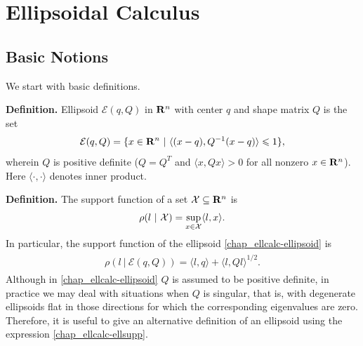 \documentclass[letterpaper,10pt,english]{sphinxmanual}
\begin{document}
\chapter{Ellipsoidal Calculus}
\label{chap_ellcalc:ellipsoidal-calculus}\label{chap_ellcalc::doc}

\section{Basic Notions}
\label{chap_ellcalc:basic-notions}
We start with basic definitions.

\textbf{Definition.} Ellipsoid \({\mathcal E}(q,Q)\) in
\({\bf R}^n\) with center \(q\) and shape matrix \(Q\) is
the set
\label{chap_ellcalc:equation-ellipsoid}\begin{gather}
\begin{split}{\mathcal E}(q,Q) = \{ x \in {\bf R}^n ~|~ \langle (x-q), Q^{-1}(x-q)\rangle\leqslant1 \},\end{split}\label{chap_ellcalc-ellipsoid}
\end{gather}
wherein \(Q\) is positive definite (\(Q=Q^T\) and
\(\langle x, Qx\rangle>0\) for all nonzero \(x\in{\bf R}^n\)).
Here \(\langle\cdot,\cdot\rangle\) denotes inner
product.

\textbf{Definition.} The support function of a set
\({\mathcal X}\subseteq{\bf R}^n\) is
\begin{gather}
\begin{split}\rho(l~|~{\mathcal X}) = \sup_{x\in{\mathcal X}} \langle l,x\rangle.\end{split}\notag
\end{gather}
In particular, the support function of the ellipsoid \eqref{chap_ellcalc-ellipsoid} is
\label{chap_ellcalc:equation-ellsupp}\begin{gather}
\begin{split}\rho(l~|~{\mathcal E}(q,Q)) = \langle l, q\rangle + \langle l, Ql\rangle^{1/2}.\end{split}\label{chap_ellcalc-ellsupp}
\end{gather}
Although in \eqref{chap_ellcalc-ellipsoid} \(Q\) is assumed to be positive definite,
in practice we may deal with situations when \(Q\) is singular, that
is, with degenerate ellipsoids flat in those directions for which the
corresponding eigenvalues are zero. Therefore, it is useful to give an
alternative definition of an ellipsoid using the expression \eqref{chap_ellcalc-ellsupp}.
\end{document}
